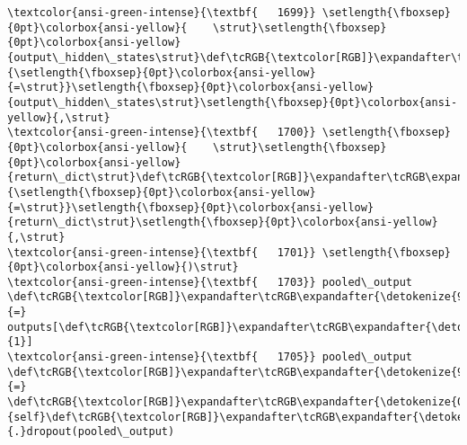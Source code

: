 \documentclass[11pt]{article}
\begin{document}
\begin{Verbatim}[commandchars=\\\{\}, frame=single, framerule=2mm, rulecolor=\color{outerrorbackground}]
\textcolor{ansi-green-intense}{\textbf{   1699}} \setlength{\fboxsep}{0pt}\colorbox{ansi-yellow}{    \strut}\setlength{\fboxsep}{0pt}\colorbox{ansi-yellow}{output\_hidden\_states\strut}\def\tcRGB{\textcolor[RGB]}\expandafter\tcRGB\expandafter{\detokenize{98,98,98}}{\setlength{\fboxsep}{0pt}\colorbox{ansi-yellow}{=\strut}}\setlength{\fboxsep}{0pt}\colorbox{ansi-yellow}{output\_hidden\_states\strut}\setlength{\fboxsep}{0pt}\colorbox{ansi-yellow}{,\strut}
\textcolor{ansi-green-intense}{\textbf{   1700}} \setlength{\fboxsep}{0pt}\colorbox{ansi-yellow}{    \strut}\setlength{\fboxsep}{0pt}\colorbox{ansi-yellow}{return\_dict\strut}\def\tcRGB{\textcolor[RGB]}\expandafter\tcRGB\expandafter{\detokenize{98,98,98}}{\setlength{\fboxsep}{0pt}\colorbox{ansi-yellow}{=\strut}}\setlength{\fboxsep}{0pt}\colorbox{ansi-yellow}{return\_dict\strut}\setlength{\fboxsep}{0pt}\colorbox{ansi-yellow}{,\strut}
\textcolor{ansi-green-intense}{\textbf{   1701}} \setlength{\fboxsep}{0pt}\colorbox{ansi-yellow}{)\strut}
\textcolor{ansi-green-intense}{\textbf{   1703}} pooled\_output \def\tcRGB{\textcolor[RGB]}\expandafter\tcRGB\expandafter{\detokenize{98,98,98}}{=} outputs[\def\tcRGB{\textcolor[RGB]}\expandafter\tcRGB\expandafter{\detokenize{98,98,98}}{1}]
\textcolor{ansi-green-intense}{\textbf{   1705}} pooled\_output \def\tcRGB{\textcolor[RGB]}\expandafter\tcRGB\expandafter{\detokenize{98,98,98}}{=} \def\tcRGB{\textcolor[RGB]}\expandafter\tcRGB\expandafter{\detokenize{0,135,0}}{self}\def\tcRGB{\textcolor[RGB]}\expandafter\tcRGB\expandafter{\detokenize{98,98,98}}{.}dropout(pooled\_output)


\end{Verbatim}
\end{document}
